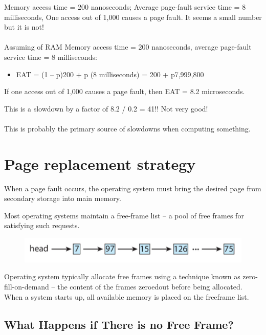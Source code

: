 Memory access time = 200 nanoseconds; Average page-fault service time = 8 milliseconds, One access out of 1,000 causes a page fault. It seems a small number but it is not!

\paragraph{}
Assuming of RAM Memory access time = 200 nanoseconds, average page-fault service time = 8 milliseconds:

\begin{itemize}
    \centering 
    \item[] EAT = (1 – p)200 + p (8 milliseconds) = 200 + p7,999,800
\end{itemize}

If one access out of 1,000 causes a page fault, then EAT = 8.2 microseconds. 

This is a slowdown by a factor of 8.2 / 0.2 = 41!! Not very good!

\paragraph{}
This is probably the primary source of slowdowns when computing something.

\newpage
\section{Page replacement strategy}

When a page fault occurs, the operating system must bring the
desired page from secondary storage into main memory. 

Most operating systems maintain a free-frame list -- a pool of free
frames for satisfying such requests.


\begin{figure}[htbp]
    \centering
    \includegraphics[width=0.5\linewidth]{img/rhsbgfw.png}
\end{figure}

Operating system typically allocate free frames using a technique
known as zero-fill-on-demand -- the content of the frames zeroedout before being allocated. When a system starts up, all available memory is placed on the freeframe list.

\subsection{What Happens if There is no Free Frame?}

